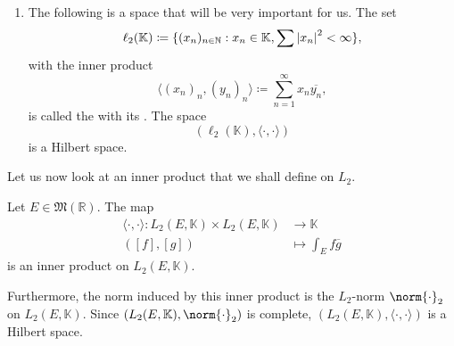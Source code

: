 \documentclass[notoc,notitlepage]{tufte-book}
\begin{document}
\begin{eg}
\begin{enumerate}
    \item The following is a space that will be very important for us.
      The set
      \begin{equation*}
        \ell_2(\mathbb{K}) \coloneqq \{ (x_n)_{n \in \mathbb{N}} 
          : x_n \in \mathbb{K}, \sum \left|x_n\right|^2 < \infty \},
      \end{equation*}
      with the inner product
      \begin{equation*}
        \langle (x_n)_n, (y_n)_n \rangle \coloneqq \sum_{n=1}^{\infty} x_n
        \overline{y_n},
      \end{equation*}
      is called the   with its
      .
      The space
      \begin{equation*}
        (\ell_2(\mathbb{K}), \langle \cdot, \cdot \rangle)
      \end{equation*}
      is a Hilbert space.
  \end{enumerate}
\end{eg}

Let us now look at an inner product that we shall define on $L_2$.

\begin{thm}\label{thm:the_standard_inner_product_for_l_2_e_mathbb_k_}
  Let $E \in \mathfrak{M}(\mathbb{R})$. The map
  \begin{align*}
    \langle \cdot, \cdot \rangle
      : L_2(E, \mathbb{K}) \times L_2(E, \mathbb{K}) &\to \mathbb{K} \\
      ([f], [g]) &\mapsto \int_{E} f \overline{g}
  \end{align*}
  is an inner product on $L_2(E, \mathbb{K})$.

  Furthermore, the norm induced by this inner product is the $L_2$-norm
  $\norm{\cdot}_2$ on $L_2(E, \mathbb{K})$.
  Since $(L_2(E, \mathbb{K}), \norm{\cdot}_2)$ is complete,
  $(L_2(E, \mathbb{K}), \langle \cdot, \cdot \rangle)$ is a Hilbert space.
\end{thm}
\end{document}
